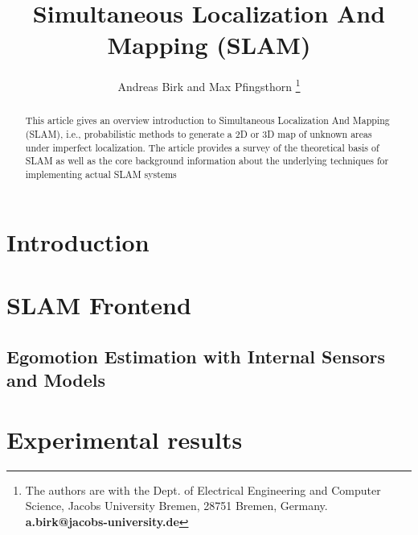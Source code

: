 \documentclass[english]{article}
\begin{document}
\title{Simultaneous Localization And Mapping (SLAM)}

\author{
Andreas Birk and Max Pfingsthorn
\thanks{The authors are with the Dept. of Electrical Engineering and Computer Science, Jacobs University Bremen, 28751 Bremen, Germany.
\textbf{a.birk@jacobs-university.de}}
}

\nocite{*}
\maketitle

\begin{abstract}
    This article gives an overview introduction to Simultaneous Localization And Mapping (SLAM), i.e., probabilistic
    methods to generate a 2D or 3D map of unknown areas under imperfect localization. The article provides a
    survey of the theoretical basis of SLAM as well as the core background information about the underlying techniques
    for implementing actual SLAM systems
\end{abstract}

\section{Introduction}
\noindent

\section{SLAM Frontend}
\subsection{Egomotion Estimation with Internal Sensors and Models}
\noindent

\section{Experimental results}


{\small


}
\end{document}
